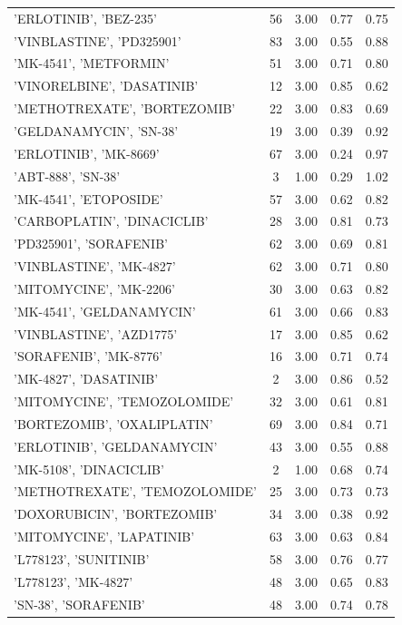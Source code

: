 \begin{center}
\begin{longtable}{@{}lcccc@{}}
    'ERLOTINIB', 'BEZ-235' & 56 & 3.00 & 0.77 & 0.75 \\
    'VINBLASTINE', 'PD325901' & 83 & 3.00 & 0.55 & 0.88 \\
    'MK-4541', 'METFORMIN' & 51 & 3.00 & 0.71 & 0.80 \\
    'VINORELBINE', 'DASATINIB' & 12 & 3.00 & 0.85 & 0.62 \\
    'METHOTREXATE', 'BORTEZOMIB' & 22 & 3.00 & 0.83 & 0.69 \\
    'GELDANAMYCIN', 'SN-38' & 19 & 3.00 & 0.39 & 0.92 \\
    'ERLOTINIB', 'MK-8669' & 67 & 3.00 & 0.24 & 0.97 \\
    'ABT-888', 'SN-38' & 3 & 1.00 & 0.29 & 1.02 \\
    'MK-4541', 'ETOPOSIDE' & 57 & 3.00 & 0.62 & 0.82 \\
    'CARBOPLATIN', 'DINACICLIB' & 28 & 3.00 & 0.81 & 0.73 \\
    'PD325901', 'SORAFENIB' & 62 & 3.00 & 0.69 & 0.81 \\
    'VINBLASTINE', 'MK-4827' & 62 & 3.00 & 0.71 & 0.80 \\
    'MITOMYCINE', 'MK-2206' & 30 & 3.00 & 0.63 & 0.82 \\
    'MK-4541', 'GELDANAMYCIN' & 61 & 3.00 & 0.66 & 0.83 \\
    'VINBLASTINE', 'AZD1775' & 17 & 3.00 & 0.85 & 0.62 \\
    'SORAFENIB', 'MK-8776' & 16 & 3.00 & 0.71 & 0.74 \\
    'MK-4827', 'DASATINIB' & 2 & 3.00 & 0.86 & 0.52 \\
    'MITOMYCINE', 'TEMOZOLOMIDE' & 32 & 3.00 & 0.61 & 0.81 \\
    'BORTEZOMIB', 'OXALIPLATIN' & 69 & 3.00 & 0.84 & 0.71 \\
    'ERLOTINIB', 'GELDANAMYCIN' & 43 & 3.00 & 0.55 & 0.88 \\
    'MK-5108', 'DINACICLIB' & 2 & 1.00 & 0.68 & 0.74 \\
    'METHOTREXATE', 'TEMOZOLOMIDE' & 25 & 3.00 & 0.73 & 0.73 \\
    'DOXORUBICIN', 'BORTEZOMIB' & 34 & 3.00 & 0.38 & 0.92 \\
    'MITOMYCINE', 'LAPATINIB' & 63 & 3.00 & 0.63 & 0.84 \\
    'L778123', 'SUNITINIB' & 58 & 3.00 & 0.76 & 0.77 \\
    'L778123', 'MK-4827' & 48 & 3.00 & 0.65 & 0.83 \\
    'SN-38', 'SORAFENIB' & 48 & 3.00 & 0.74 & 0.78 \\

\end{longtable}
\end{center}
